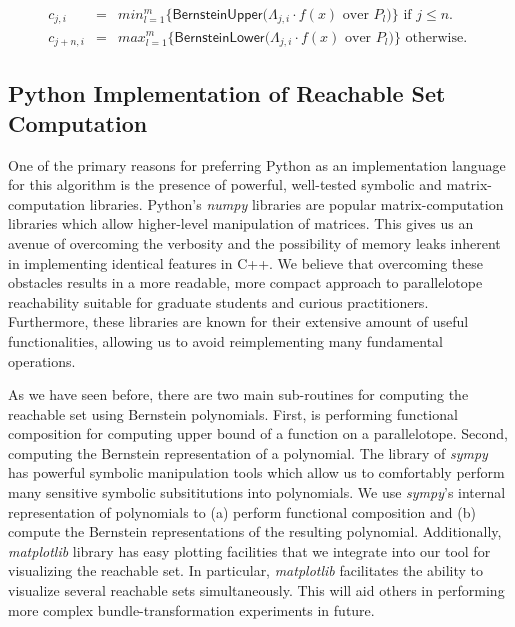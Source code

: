 \documentclass[EPiC]{easychair}
\begin{document}
\begin{eqnarray}
c_{j,i} &=& min_{l = 1}^{m} \Big\{ \mathsf{BernsteinUpper}\big(\Lambda_{j,i} \cdot f(x) \mbox{ over } P_l \big) \Big\} \mbox{ if } j \leq n. \label{eq:upper} \\
c_{j+n,i} &=& max_{l = 1}^{m} \Big\{ \mathsf{BernsteinLower}\big(\Lambda_{j,i} \cdot f(x) \mbox{ over } P_l \big) \Big\} \mbox{ otherwise. } \label{eq:lower}
\end{eqnarray}

\subsection{Python Implementation of Reachable Set Computation}

One of the primary reasons for preferring Python as an implementation language for this algorithm is the presence of powerful, well-tested symbolic and matrix-computation libraries.
%
Python's \emph{numpy} libraries are popular matrix-computation libraries which allow higher-level manipulation of matrices. This gives us an avenue of overcoming the verbosity and the possibility of memory leaks inherent in implementing identical features in C++. We believe that overcoming these obstacles results in a more readable, more compact approach to parallelotope reachability suitable for graduate students and curious practitioners. Furthermore, these libraries are known for their extensive amount of useful functionalities, allowing us to avoid reimplementing many fundamental operations.

%
As we have seen before, there are two main sub-routines for computing the reachable set using Bernstein polynomials.
%
First, is performing functional composition for computing upper bound of a function on a parallelotope.
%
Second, computing the Bernstein representation of a polynomial.
%
The library of \emph{sympy} has powerful symbolic manipulation tools which allow us to comfortably perform many sensitive symbolic subsititutions into polynomials. 
%
We use \emph{sympy}'s internal representation of polynomials to (a) perform functional composition and (b) compute the Bernstein representations of the resulting polynomial.
%
Additionally, \emph{matplotlib} library has easy plotting facilities that we integrate into our tool for visualizing the reachable set. In particular, \emph{matplotlib} facilitates the ability to visualize several reachable sets simultaneously. This will aid others in performing more complex bundle-transformation experiments in future. 
\end{document}
